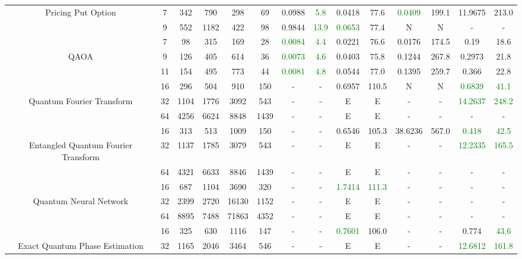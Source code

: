 \begin{table}[htb]
{\begin{tabular}{|c|c|c|c|c|c|c|c|c|c|c|c|c|c|}
Pricing Put Option & 
7 & 342 & 790 & 298 & 69
 & 0.0988 & \textcolor{green}{5.8}
 & 0.0418 & 77.6
 & \textcolor{green}{0.0409} & 199.1
 & 11.9675 & 213.0
 \\
 & 
9 & 552 & 1182 & 422 & 98
 & 0.9844 & \textcolor{green}{13.9}
 & \textcolor{green}{0.0653} & 77.4
 & N & N 
 & - & -
 \\
\hline
 & 
7 & 98 & 315 & 169 & 28
 & \textcolor{green}{0.0084} & \textcolor{green}{4.4}
 & 0.0221 & 76.6
 & 0.0176 & 174.5
 & 0.19 & 18.6
 \\
QAOA & 
9 & 126 & 405 & 614 & 36
 & \textcolor{green}{0.0073} & \textcolor{green}{4.6}
 & 0.0403 & 75.8
 & 0.1244 & 267.8
 & 0.2973 & 21.8
 \\
 & 
11 & 154 & 495 & 773 & 44
 & \textcolor{green}{0.0081} & \textcolor{green}{4.8}
 & 0.0544 & 77.0
 & 0.1395 & 259.7
 & 0.366 & 22.8
 \\
\hline
 & 
16 & 296 & 504 & 910 & 150
 & - & -
 & 0.6957 & 110.5
 & N & N 
 & \textcolor{green}{0.6839} & \textcolor{green}{41.1}
 \\
Quantum Fourier Transform & 
32 & 1104 & 1776 & 3092 & 543
 & - & -
 & E & E
 & - & -
 & \textcolor{green}{14.2637} & \textcolor{green}{248.2}
 \\
 & 
64 & 4256 & 6624 & 8848 & 1439
 & - & -
 & E & E
 & - & -
 & - & -
 \\
\hline
 & 
16 & 313 & 513 & 1009 & 150
 & - & -
 & 0.6546 & 105.3
 & 38.6236 & 567.0
 & \textcolor{green}{0.418} & \textcolor{green}{42.5}
 \\
Entangled Quantum Fourier Transform & 
32 & 1137 & 1785 & 3079 & 543
 & - & -
 & E & E
 & - & -
 & \textcolor{green}{12.2335} & \textcolor{green}{165.5}
 \\
 & 
64 & 4321 & 6633 & 8846 & 1439
 & - & -
 & E & E
 & - & -
 & - & -
 \\
\hline
 & 
16 & 687 & 1104 & 3690 & 320
 & - & -
 & \textcolor{green}{1.7414} & \textcolor{green}{111.3}
 & - & -
 & - & -
 \\
Quantum Neural Network & 
32 & 2399 & 2720 & 16130 & 1152
 & - & -
 & E & E
 & - & -
 & - & -
 \\
 & 
64 & 8895 & 7488 & 71863 & 4352
 & - & -
 & E & E
 & - & -
 & - & -
 \\
\hline
 & 
16 & 325 & 630 & 1116 & 147
 & - & -
 & \textcolor{green}{0.7601} & 106.0
 & - & -
 & 0.774 & \textcolor{green}{43.6}
 \\
Exact Quantum Phase Estimation & 
32 & 1165 & 2046 & 3464 & 546
 & - & -
 & E & E
 & - & -
 & \textcolor{green}{12.6812} & \textcolor{green}{161.8}

\end{tabular}}
\end{table}
